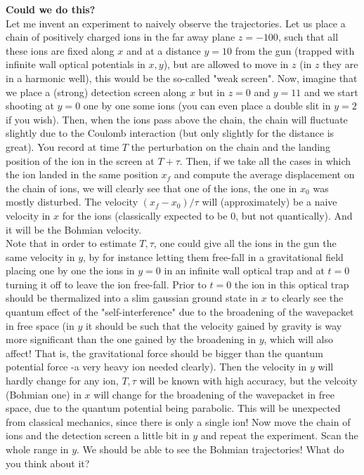 \documentclass[11pt, a4paper]{article} %
\DeclareRobustCommand{\mybox}[2][gray!10]{%
\begin{tcolorbox}[   %
        left=0.2cm,
        right=0.2cm,
        top=0.15cm,
        bottom=0.15cm,
        colback=#1,
        colframe=#1,
        width=\dimexpr\textwidth\relax, 
        enlarge left by=0mm,
        boxsep=5pt,
        arc=0pt,outer arc=0pt,
        ]
        #2
\end{tcolorbox}
}
\begin{document}
\mybox{{\bf Could we do this?\\ }
Let me invent an experiment to naively observe the trajectories. Let us place a chain of positively charged ions in the far away plane $z=-100$, such that all these ions are fixed along $x$ and at a distance $y=10$ from the gun (trapped with infinite wall optical potentials in $x,y$), but are allowed to move in $z$ (in $z$ they are in a harmonic well), this would be the so-called "weak screen". Now, imagine that we place a (strong) detection screen along $x$ but in $z=0$ and $y=11$ and we start shooting at $y=0$ one by one some ions (you can even place a double slit in $y=2$ if you wish). Then, when the ions pass above the chain, the chain will fluctuate slightly due to the Coulomb interaction (but only slightly for the distance is great). You record at time $T$ the perturbation on the chain and the landing position of the ion in the screen at $T+\tau$. Then, if we take all the cases in which the ion landed in the same position $x_f$ and compute the average displacement on the chain of ions, we will clearly see that one of the ions, the one in $x_0$ was mostly disturbed. The velocity $(x_f-x_0)/\tau$ will (approximately) be a naive velocity in $x$ for the ions (classically expected to be 0, but not quantically). And it will be the Bohmian velocity.\\

Note that in order to estimate $T,\tau$, one could give all the ions in the gun the same velocity in $y$, by for instance letting them free-fall in a gravitational field placing one by one the ions in $y=0$ in an infinite wall optical trap and at $t=0$ turning it off to leave the ion free-fall. Prior to $t=0$ the ion in this optical trap should be thermalized into a slim gaussian ground state in $x$ to clearly see the quantum effect of the "self-interference" due to the broadening of the wavepacket in free space (in $y$ it should be such that the velocity gained by gravity is way more significant than the one gained by the broadening in $y$, which will also affect! That is, the gravitational force should be bigger than the quantum potential force -a very heavy ion needed clearly). Then the velocity in $y$ will hardly change for any ion, $T,\tau$ will be known with high accuracy, but the velcoity (Bohmian one) in $x$ will change for the broadening of the wavepacket in free space, due to the quantum potential being parabolic. This will be unexpected from classical mechanics, since there is only a single ion! Now move the chain of ions and the detection screen a little bit in $y$ and repeat the experiment. Scan the whole range in $y$. We should be able to see the Bohmian trajectories! What do you think about it?
 }
 
\end{document}
